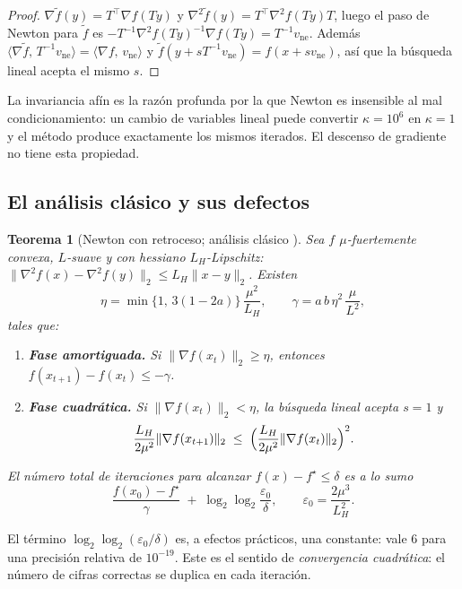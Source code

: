 \documentclass[11pt,a4paper,oneside]{book}
\newtheorem{teorema}{Teorema}[chapter]
\theoremstyle{definition}
\theoremstyle{remark}
\newcommand{\T}{^{\top}}
\newcommand{\eps}{\varepsilon}
\newcommand{\nrm}[1]{\lVert #1\rVert}
\newcommand{\ip}[2]{\langle #1,\, #2\rangle}
\newcommand{\vne}{v_{\mathrm{ne}}}
\newcommand{\LH}{L_{H}}
\begin{document}
\begin{proof}
$\nabla\tilde f(y)=T\T\nabla f(Ty)$ y $\nabla^2\tilde f(y)=T\T\nabla^2 f(Ty)T$, luego el paso de Newton para
$\tilde f$ es $-T^{-1}\nabla^2 f(Ty)^{-1}\nabla f(Ty)=T^{-1}\vne$. Además $\ip{\nabla \tilde f}{T^{-1}\vne}=\ip{\nabla f}{\vne}$
y $\tilde f(y+sT^{-1}\vne)=f(x+s\vne)$, así que la búsqueda lineal acepta el mismo $s$.
\end{proof}

La invariancia afín es la razón profunda por la que Newton es insensible al mal condicionamiento: un cambio de
variables lineal puede convertir $\kappa=10^6$ en $\kappa=1$ y el método produce exactamente los mismos
iterados. El descenso de gradiente no tiene esta propiedad.

\subsection{El análisis clásico y sus defectos}

\begin{teorema}[Newton con retroceso; análisis clásico {\cite[§9.5.3]{BV}}]\label{teo:newton-clasico}
Sea $f$ $\mu$-fuertemente convexa, $L$-suave y con hessiano $\LH$-Lipschitz:
$\nrm{\nabla^2 f(x)-\nabla^2 f(y)}_2\le\LH\nrm{x-y}_2$. Existen
\[ \eta=\min\{1,\,3(1-2a)\}\,\frac{\mu^2}{\LH}, \qquad \gamma=a\,b\,\eta^2\,\frac{\mu}{L^2}, \]
tales que:
\begin{enumerate}[label=(\roman*)]
  \item \textbf{Fase amortiguada.} Si $\nrm{\nabla f(x_t)}_2\ge\eta$, entonces $f(x_{t+1})-f(x_t)\le-\gamma$.
  \item \textbf{Fase cuadrática.} Si $\nrm{\nabla f(x_t)}_2<\eta$, la búsqueda lineal acepta $s=1$ y
  \[ \frac{\LH}{2\mu^2}\nrm{\nabla f(x_{t+1})}_2\;\le\;\Bigl(\frac{\LH}{2\mu^2}\nrm{\nabla f(x_t)}_2\Bigr)^{2}. \]
\end{enumerate}
El número total de iteraciones para alcanzar $f(x)-f^\star\le\delta$ es a lo sumo
\[ \frac{f(x_0)-f^\star}{\gamma}\;+\;\log_2\log_2\frac{\eps_0}{\delta},\qquad \eps_0=\frac{2\mu^3}{\LH^2}. \]
\end{teorema}

El término $\log_2\log_2(\eps_0/\delta)$ es, a efectos prácticos, una constante: vale $6$ para una precisión
relativa de $10^{-19}$. Este es el sentido de \emph{convergencia cuadrática}: el número de cifras correctas se
duplica en cada iteración.
\end{document}
